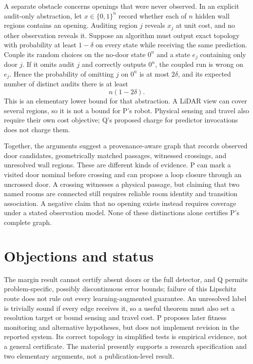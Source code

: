 \documentclass{article}
\begin{document}
A separate obstacle concerns openings that were never observed. In an explicit audit-only abstraction, let \(x\in\{0,1\}^n\) record whether each of \(n\) hidden wall regions contains an opening. Auditing region \(j\) reveals \(x_j\) at unit cost, and no other observation reveals it. Suppose an algorithm must output exact topology with probability at least \(1-\delta\) on every state while receiving the same prediction. Couple its random choices on the no-door state \(0^n\) and a state \(e_j\) containing only door \(j\). If it omits audit \(j\) and correctly outputs \(0^n\), the coupled run is wrong on \(e_j\). Hence the probability of omitting \(j\) on \(0^n\) is at most \(2\delta\), and its expected number of distinct audits there is at least
\[
n(1-2\delta).
\]
This is an elementary lower bound for that abstraction. A LiDAR view can cover several regions, so it is not a bound for P's robot. Physical sensing and travel also require their own cost objective; Q's proposed charge for predictor invocations does not charge them. 

Together, the arguments suggest a provenance-aware graph that records observed door candidates, geometrically matched passages, witnessed crossings, and unresolved wall regions. These are different kinds of evidence. P can mark a visited door nominal before crossing and can propose a loop closure through an uncrossed door. A crossing witnesses a physical passage, but claiming that two named rooms are connected still requires reliable room identity and transition association. A negative claim that no opening exists instead requires coverage under a stated observation model. None of these distinctions alone certifies P's complete graph. 

\section*{Objections and status}

The margin result cannot certify absent doors or the full detector, and Q permits problem-specific, possibly discontinuous error bounds; failure of this Lipschitz route does not rule out every learning-augmented guarantee. An unresolved label is trivially sound if every edge receives it, so a useful theorem must also set a resolution target or bound sensing and travel cost. P proposes later fitness monitoring and alternative hypotheses, but does not implement revision in the reported system. Its correct topology in simplified tests is empirical evidence, not a general certificate. The material presently supports a research specification and two elementary arguments, not a publication-level result. 
\end{document}
